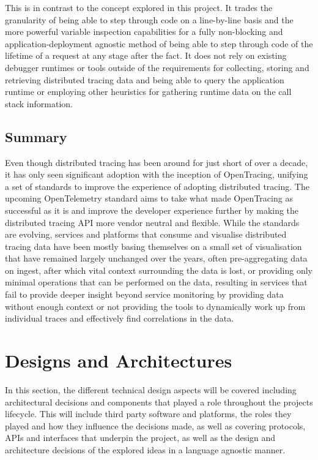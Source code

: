 \documentclass[12pt,pdftex,titlepage]{report}
\begin{document}
                This is in contrast to the concept explored in this project. It trades the granularity of being able to step through code on a line-by-line basis and
                the more powerful variable inspection capabilities for a fully non-blocking and application-deployment agnostic method of being able to step through code
                of the lifetime of a request at any stage after the fact. It does not rely on existing debugger runtimes or tools outside of the requirements for collecting,
                storing and retrieving distributed tracing data and being able to query the application runtime or employing other heuristics for gathering runtime data
                on the call stack information.
        
        \section{Summary}
            Even though distributed tracing has been around for just short of over a decade, it has only seen significant adoption with the inception of OpenTracing, unifying a set
            of standards to improve the experience of adopting distributed tracing. The upcoming OpenTelemetry standard aims to take what made OpenTracing as successful as it is and improve
            the developer experience further by making the distributed tracing API more vendor neutral and flexible. While the standards are evolving, services and platforms that consume
            and visualise distributed tracing data have been mostly basing themselves on a small set of visualisation that have remained largely unchanged over the years, often pre-aggregating
            data on ingest, after which vital context surrounding the data is lost, or providing only minimal operations that can be performed on the data, resulting in services that fail
            to provide deeper insight beyond service monitoring by providing data without enough context or not providing the tools to dynamically work up from individual traces and effectively
            find correlations in the data.
                    

    \chapter{Designs and Architectures}
    \label{sec:design}
        In this section, the different technical design aspects will be covered including architectural decisions and components that played a role throughout the projects 
        lifecycle. This will include third party software and platforms, the roles they played and how they influence the decisions made, as well as covering protocols, APIs 
        and interfaces that underpin the project, as well as the design and architecture decisions of the explored ideas in a language agnostic manner.
\end{document}

